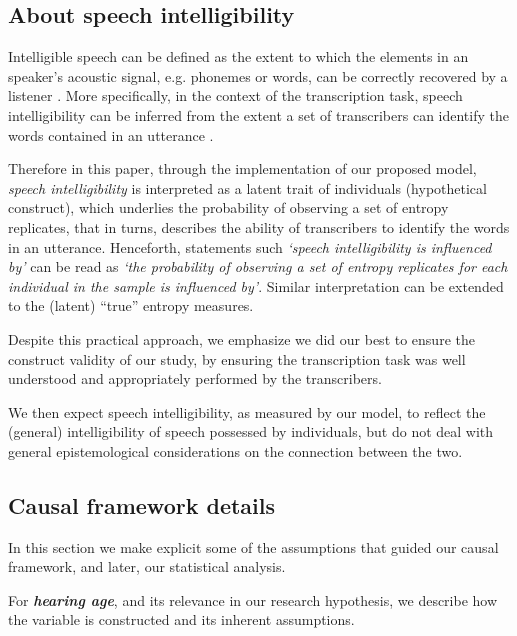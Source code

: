 \subsection{About speech intelligibility} \label{sSA:SI}
%
Intelligible speech can be defined as the extent to which the elements in an speaker's acoustic signal, e.g. phonemes or words, can be correctly recovered by a listener \citep{Kent_et_al_1989, Whitehill_et_al_2004, vanHeuven_2008, Freeman_et_al_2017}. More specifically, in the context of the transcription task, speech intelligibility can be inferred from the extent a set of transcribers can identify the words contained in an utterance \cite{Boonen_et_al_2021}.

Therefore in this paper, through the implementation of our proposed model, \textit{speech intelligibility} is interpreted as a latent trait of individuals (hypothetical construct), which underlies the probability of observing a set of entropy replicates, that in turns, describes the ability of transcribers to identify the words in an utterance. Henceforth, statements such \textit{`speech intelligibility is influenced by'} can be read as \textit{`the probability of observing a set of entropy replicates for each individual in the sample is influenced by'}. Similar interpretation can be extended to the (latent) ``true'' entropy measures.

Despite this practical approach, we emphasize we did our best to ensure the construct validity of our study, by ensuring the transcription task was well understood and appropriately performed by the transcribers.

We then expect speech intelligibility, as measured by our model, to reflect the (general) intelligibility of speech possessed by individuals, but do not deal with general epistemological considerations on the connection between the two.
%
%
\subsection{Causal framework details} \label{sSA:causal_details}
%
In this section we make explicit some of the assumptions that guided our causal framework, and later, our statistical analysis.

For \textbf{\textit{hearing age}}, and its relevance in our research hypothesis, we describe how the variable is constructed and its inherent assumptions. 

